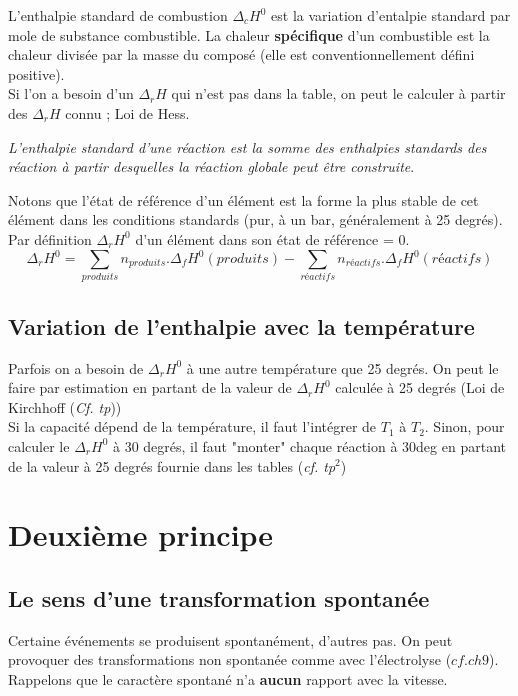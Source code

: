 \documentclass	[11pt, a4paper, openany]{book}
\begin{document}
L'enthalpie standard de combustion $\Delta_c H^0$ est la variation d'entalpie standard par mole de substance combustible.
La chaleur \textbf{spécifique} d'un combustible est la chaleur divisée par la masse du composé (elle est conventionnellement défini positive).\\

Si l'on a besoin d'un $\Delta_r H$ qui n'est pas dans la table, on peut le calculer à partir des $\Delta_r H$ connu ; Loi de Hess.
\begin{center}
	\textit{L'enthalpie standard d'une réaction est la somme des enthalpies standards des réaction à partir desquelles la réaction globale peut être construite}.
\end{center}
Notons que l'état de référence d'un élément est la forme la plus stable de cet élément dans les conditions standards (pur, à un bar, généralement à 25 degrés).\\
Par définition $\Delta_r H^0$ d'un élément dans son état de référence = 0.
$$\Delta_r H^0 = \sum_{produits} n_{produits}.\Delta_f H^0(produits) - \sum_{réactifs} n_{réactifs}.\Delta_f H^0(réactifs)$$

\subsection{Variation de l'enthalpie avec la température}
Parfois on a besoin de $\Delta_r H^0$ à une autre température que 25 degrés. On peut le faire par estimation en partant de la valeur de $\Delta_r H^0$ calculée à 25 degrés (Loi de Kirchhoff (\textit{Cf. tp}))\\
Si la capacité dépend de la température, il faut l'intégrer de $T_1$ à $T_2$. Sinon, pour calculer le $\Delta_r H^0$ à 30 degrés, il faut "monter" chaque réaction à 30deg en partant de la valeur à 25 degrés fournie dans les tables (\textit{cf. tp}$^2$)

\section{Deuxième principe}
\subsection{Le sens d'une transformation spontanée}
Certaine événements se produisent spontanément, d'autres pas. On peut provoquer des transformations non spontanée comme avec l'électrolyse ($cf. ch9$). Rappelons que le caractère spontané n'a \textbf{aucun} rapport avec la vitesse.\\
\end{document}
